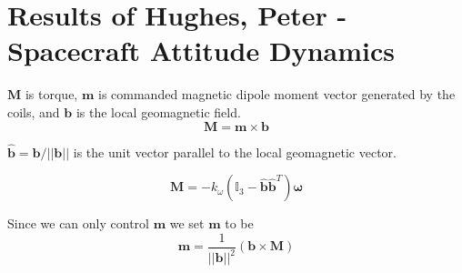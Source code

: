 \documentclass{article}
\begin{document}
    \section{Results of Hughes, Peter - Spacecraft Attitude Dynamics}


   $\bm{M}$ is torque, $\bm{m}$ is commanded magnetic dipole moment vector generated by the coils, and $\bm{b}$ is the local geomagnetic field.
   \[\bm{M}=\bm{m}\times \bm{b}\]

   $\hat{\bm{b}}=\bm{b}/||\bm{b}||$ is the unit vector parallel to the local geomagnetic vector.

   \[\bm{M} = -k_{\omega}\left(\mathbb{I}_3 - \hat{\bm{b}}\hat{\bm{b}}^T\right)\bm{\omega}\]

   Since we can only control $\bm{m}$ we set $\bm{m}$ to be
   \[\bm{m}=\frac{1}{||\bm{b}||^2}(\bm{b}\times \bm{M})\]
\end{document}
